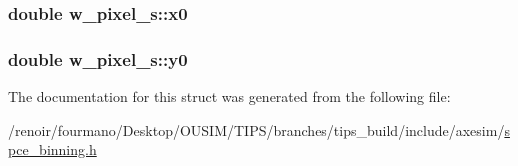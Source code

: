 \label{structw__pixel__s_ad04cb41431b0507e691b17c186986caa}
\hypertarget{structw__pixel__s_ad5f30e08ed1e83be6e28ef1681ea7dc6}{
\subsubsection[{x0}]{\setlength{\rightskip}{0pt plus 5cm}double {\bf w\_\-pixel\_\-s::x0}}}
\label{structw__pixel__s_ad5f30e08ed1e83be6e28ef1681ea7dc6}
\hypertarget{structw__pixel__s_a4e32e9f589e20889ddbe04235ceef96b}{
\subsubsection[{y0}]{\setlength{\rightskip}{0pt plus 5cm}double {\bf w\_\-pixel\_\-s::y0}}}
\label{structw__pixel__s_a4e32e9f589e20889ddbe04235ceef96b}


The documentation for this struct was generated from the following file:\begin{DoxyCompactItemize}
\item 
/renoir/fourmano/Desktop/OUSIM/TIPS/branches/tips\_\-build/include/axesim/\hyperlink{spce__binning_8h}{spce\_\-binning.h}\end{DoxyCompactItemize}
